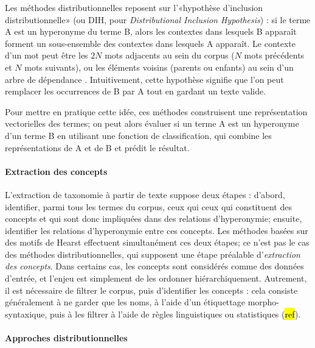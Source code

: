 Les méthodes distributionnelles reposent sur l'«hypothèse d'inclusion distributionnelle» (ou DIH, pour \textit{Distributional Inclusion Hypothesis}) \cite{geffet2005distributional} : si le terme A est un hyperonyme du terme B, alors les contextes dans lesquels B apparaît forment un sous-ensemble des contextes dans lesquels A apparaît. Le contexte d'un mot peut être les $2N$ mots adjacents au sein du corpus ($N$ mots précédents et $N$ mots suivants), ou les éléments voisins (parents ou enfants) au sein d'un arbre de dépendance \cite{shwartz-etal-2017-hypernyms}.
Intuitivement, cette hypothèse signifie que l'on peut remplacer les occurrences de B par A tout en gardant un texte valide.

Pour mettre en pratique cette idée, ces méthodes construisent une représentation vectorielles des termes; on peut alors évaluer si un terme A est un hyperonyme d'un terme B en utilisant une fonction de classification, qui combine les représentations de A et de B et prédit le résultat. 


\paragraph{Extraction des concepts}

L'extraction de taxonomie à partir de texte suppose deux étapes : d'abord, identifier, parmi tous les termes du corpus, ceux qui ceux qui constituent des concepts et qui sont donc impliquées dans des relations d'hyperonymie; ensuite, identifier les relations d'hyperonymie entre ces concepts. Les méthodes basées sur des motifs de Hearst effectuent simultanément ces deux étapes; ce n'est pas le cas des méthodes distributionnelles, qui supposent une étape préalable d'\textit{extraction des concepts}. Dans certains cas, les concepts sont considérés comme des données d'entrée, et l'enjeu est simplement de les ordonner hiérarchiquement. Autrement, il est nécessaire de filtrer le corpus, puis d'identifier les concepts : cela consiste généralement à ne garder que les noms, à l'aide d'un étiquettage morpho-syntaxique, puis à les filtrer à l'aide de règles linguistiques ou statistiques (\hl{ref}).

\paragraph{Approches distributionnelles}

